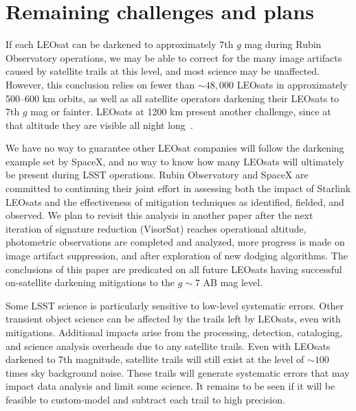 \documentclass[twocolumn,trackchanges]{aastex63}
\begin{document}

\section{Remaining challenges and plans}
\label{sec:challenges}

If each LEOsat can be darkened to approximately 7th $g$ mag during Rubin Observatory operations, we may be able to correct for the many image artifacts caused by satellite trails at this level, and most science may be unaffected. However, this
conclusion relies on fewer than $\sim48,000$ LEOsats in approximately 500--600 km orbits, as well as all satellite operators darkening their LEOsats to 7th $g$ mag or fainter.
LEOsats at 1200 km present another challenge, since at that altitude they are visible all night long~\citep{2020AAS...23541003S}.

We have no way to guarantee other LEOsat companies will follow the darkening example set by SpaceX, and no way to know how many LEOsats will ultimately be present during LSST operations. Rubin Observatory and SpaceX are committed to continuing their joint effort in assessing both the impact of Starlink LEOsats and the effectiveness of mitigation techniques as identified, fielded, and observed. We plan to revisit this analysis in another paper after the next iteration of signature reduction (VisorSat) reaches operational altitude, photometric observations are completed and analyzed, more progress is made on image artifact suppression, and after exploration of new dodging algorithms. The conclusions of this paper are predicated on all future LEOsats having successful on-satellite darkening mitigations to the $g\sim7$ AB mag level.

Some LSST science is particularly sensitive to low-level systematic errors. Other transient object science can be affected by the trails left by LEOsats, even with mitigations. Additional impacts arise from the processing, detection, cataloging, and science analysis overheads due to any satellite trails. Even with LEOsats darkened to 7th magnitude, satellite trails will still exist at the level of $\sim100$ times sky background noise. These trails will generate systematic errors that may impact data analysis and limit some science.
It remains to be seen if it will be feasible to custom-model and subtract each trail to high precision.
\end{document}
